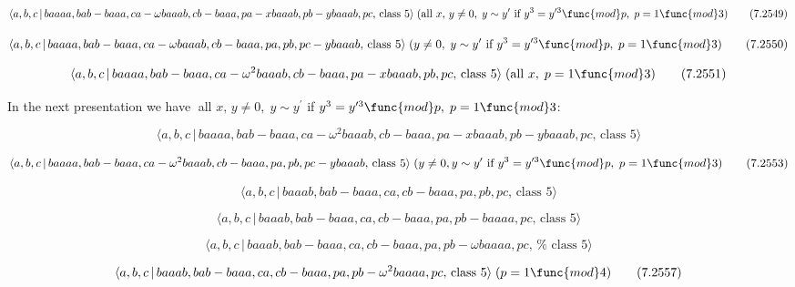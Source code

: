 \documentclass[10pt]{article}
\begin{document}
\begin{equation}
\langle a,b,c\,|\,baaaa,bab-baaa,ca-\omega
baaab,cb-baaa,pa-xbaaab,pb-ybaaab,pc,\,\text{class }5\rangle \;(\text{all }%
x,\,y\neq 0,\;y\sim y^{\prime }\text{ if }y^{3}=y^{\prime 3}\func{mod}p,\;p=1%
\func{mod}3)  \tag{7.2549}
\end{equation}

\begin{equation}
\langle a,b,c\,|\,baaaa,bab-baaa,ca-\omega baaab,cb-baaa,pa,pb,pc-ybaaab,\,%
\text{class }5\rangle \;(y\neq 0,\;y\sim y^{\prime }\text{ if }%
y^{3}=y^{\prime 3}\func{mod}p,\;p=1\func{mod}3)  \tag{7.2550}
\end{equation}

\begin{equation}
\langle a,b,c\,|\,baaaa,bab-baaa,ca-\omega
^{2}baaab,cb-baaa,pa-xbaaab,pb,pc,\,\text{class }5\rangle \;(\text{all }%
x,\;p=1\func{mod}3)  \tag{7.2551}
\end{equation}

In the next presentation we have $\;$all $x,\,y\neq 0,\;y\sim y^{\prime }$
if $y^{3}=y^{\prime 3}\func{mod}p,\;p=1\func{mod}3$:

\begin{equation}
\langle a,b,c\,|\,baaaa,bab-baaa,ca-\omega
^{2}baaab,cb-baaa,pa-xbaaab,pb-ybaaab,pc,\,\text{class }5\rangle 
\tag{7.2552}
\end{equation}

\begin{equation}
\langle a,b,c\,|\,baaaa,bab-baaa,ca-\omega
^{2}baaab,cb-baaa,pa,pb,pc-ybaaab,\,\text{class }5\rangle \;(y\neq 0,y\sim
y^{\prime}\text{ if }y^3 =y^{\prime 3}\func{mod}p,\;p=1\func{mod}3) 
\tag{7.2553}
\end{equation}

\begin{equation}
\langle a,b,c\,|\,baaab,bab-baaa,ca,cb-baaa,pa,pb,pc,\,\text{class }5\rangle
\tag{7.2554}
\end{equation}

\begin{equation}
\langle a,b,c\,|\,baaab,bab-baaa,ca,cb-baaa,pa,pb-baaaa,pc,\,\text{class }%
5\rangle  \tag{7.2555}
\end{equation}

\begin{equation}
\langle a,b,c\,|\,baaab,bab-baaa,ca,cb-baaa,pa,pb-\omega baaaa,pc,\,\text{%
class }5\rangle  \tag{7.2556}
\end{equation}

\begin{equation}
\langle a,b,c\,|\,baaab,bab-baaa,ca,cb-baaa,pa,pb-\omega ^{2}baaaa,pc,\,%
\text{class }5\rangle \;(p=1\func{mod}4)  \tag{7.2557}
\end{equation}
\end{document}

